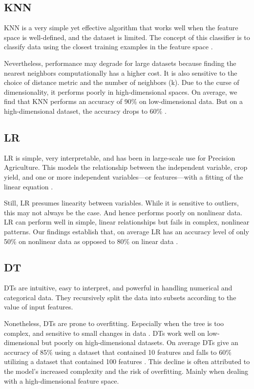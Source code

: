 \documentclass[conference]{IEEEtran}
\begin{document}
\subsection{KNN}\label{AA}
KNN is a very simple yet effective algorithm that works well when the feature space is well-defined, and the dataset is limited. The concept of this classifier is to classify data using the closest training examples in the feature space \cite{b17}. 

Nevertheless, performance may degrade for large datasets because finding the nearest neighbors computationally has a higher cost. It is also sensitive to the choice of distance metric and the number of neighbors (k). Due to the curse of dimensionality, it performs poorly in high-dimensional spaces. On average, we find that KNN performs an accuracy of 90\% on low-dimensional data. But on a high-dimensional dataset, the accuracy drops to 60\% \cite{b18}. 

\subsection{LR}\label{AA}
LR is simple, very interpretable, and has been in large-scale use for Precision Agriculture. This models the relationship between the independent variable, crop yield, and one or more independent variables—or features—with a fitting of the linear equation \cite{b19}. 

Still, LR presumes linearity between variables. While it is sensitive to outliers, this may not always be the case. And hence performs poorly on nonlinear data. LR can perform well in simple, linear relationships but fails in complex, nonlinear patterns. Our findings establish that, on average LR has an accuracy level of only 50\% on nonlinear data as opposed to 80\% on linear data \cite{b20}.

\subsection{DT}\label{AA}
DTs are intuitive, easy to interpret, and powerful in handling numerical and categorical data. They recursively split the data into subsets according to the value of input features. 

Nonetheless, DTs are prone to overfitting. Especially when the tree is too complex, and sensitive to small changes in data \cite{b21}. DTs work well on low-dimensional but poorly on high-dimensional datasets. On average DTs give an accuracy of 85\% using a dataset that contained 10 features and falls to 60\% utilizing a dataset that contained 100 features \cite{b22}. This decline is often attributed to the model's increased complexity and the risk of overfitting. Mainly when dealing with a high-dimensional feature space.
\end{document}
